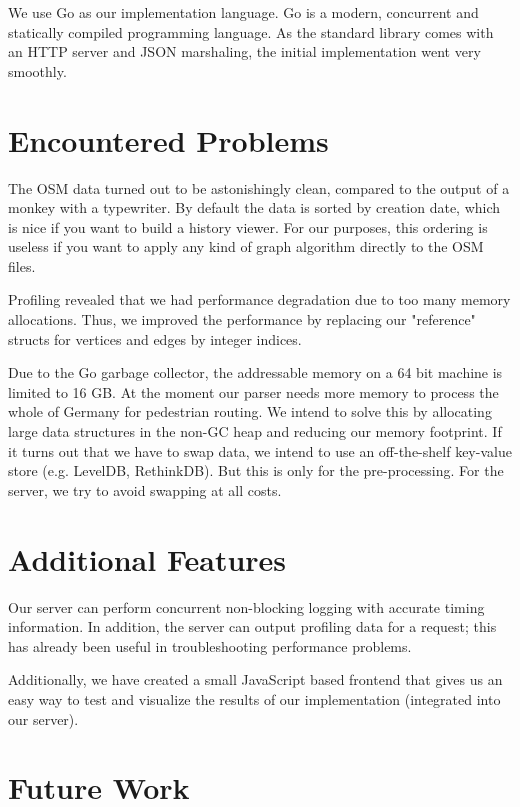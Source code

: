 \documentclass[a4paper]{article}
\begin{document}
We use Go as our implementation language.
Go is a modern, concurrent and statically compiled programming language.
As the standard library comes with an HTTP server and JSON marshaling,
the initial implementation went very smoothly.

\section{Encountered Problems}

The OSM data turned out to be astonishingly clean, compared to the output of a monkey with a typewriter.
By default the data is sorted by creation date, which is nice if you want to build a history viewer.
For our purposes, this ordering is useless if you want to apply any kind of graph algorithm
directly to the OSM files.

Profiling revealed that we had performance degradation due to too many memory allocations.
Thus, we improved the performance by replacing our "reference" structs for vertices and edges by integer indices.

Due to the Go garbage collector, the addressable memory on a 64 bit machine is limited to 16 GB.
At the moment our parser needs more memory to process the whole of Germany for pedestrian routing.
We intend to solve this by allocating large data structures in the non-GC heap
and reducing our memory footprint.
If it turns out that we have to swap data, we intend to use an off-the-shelf key-value store (e.g. LevelDB, RethinkDB).
But this is only for the pre-processing.
For the server, we try to avoid swapping at all costs.

\section{Additional Features}

Our server can perform concurrent non-blocking logging with accurate timing information.
In addition, the server can output profiling data for a request;
this has already been useful in troubleshooting performance problems.

Additionally, we have created a small JavaScript based frontend that 
gives us an easy way to test and visualize the results of our implementation
(integrated into our server).

\section{Future Work}
\end{document}
